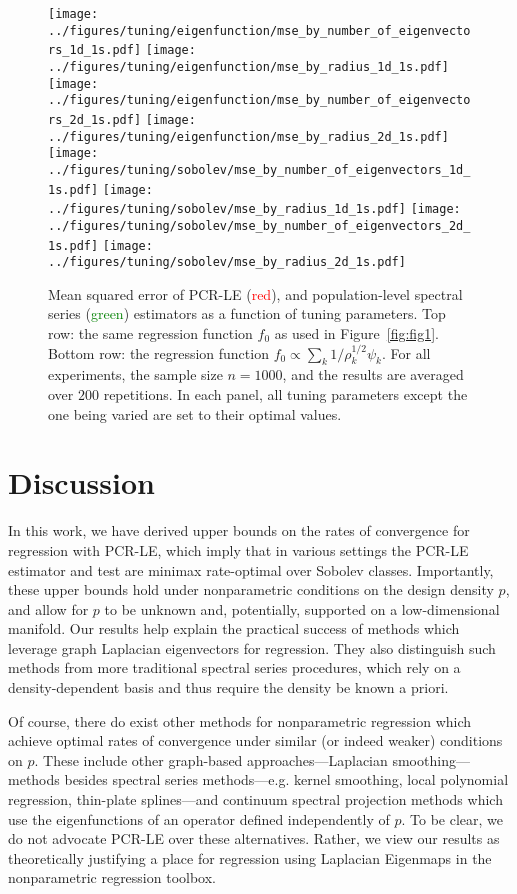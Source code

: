 \begin{figure*}[tb]
	\texttt{[image: ../figures/tuning/eigenfunction/mse\_by\_number\_of\_eigenvectors\_1d\_1s.pdf]}
	\texttt{[image: ../figures/tuning/eigenfunction/mse\_by\_radius\_1d\_1s.pdf]} 
	\texttt{[image: ../figures/tuning/eigenfunction/mse\_by\_number\_of\_eigenvectors\_2d\_1s.pdf]}
	\texttt{[image: ../figures/tuning/eigenfunction/mse\_by\_radius\_2d\_1s.pdf]} 
	\texttt{[image: ../figures/tuning/sobolev/mse\_by\_number\_of\_eigenvectors\_1d\_1s.pdf]}
	\texttt{[image: ../figures/tuning/sobolev/mse\_by\_radius\_1d\_1s.pdf]}
	\texttt{[image: ../figures/tuning/sobolev/mse\_by\_number\_of\_eigenvectors\_2d\_1s.pdf]}
	\texttt{[image: ../figures/tuning/sobolev/mse\_by\_radius\_2d\_1s.pdf]}  
	\caption{Mean squared error of PCR-LE (\textcolor{red}{red}), and population-level spectral series (\textcolor{green}{green}) estimators as a function of tuning parameters. Top row: the same regression function $f_0$ as used in Figure~\ref{fig:fig1}. Bottom row: the regression function $f_0 \propto \sum_{k} 1/\rho_k^{1/2} \psi_k$. For all experiments, the sample size $n = 1000$, and the results are averaged over $200$ repetitions. In each panel, all tuning parameters except the one being varied are set to their optimal values.}
	\label{fig:fig3}
\end{figure*}

\section{Discussion}
\label{sec:discussion}

In this work, we have derived upper bounds on the rates of convergence for regression with PCR-LE, which imply that in various settings the PCR-LE estimator and test are minimax rate-optimal over Sobolev classes. Importantly, these upper bounds hold under nonparametric conditions on the design density $p$, and allow for $p$ to be unknown and, potentially, supported on a low-dimensional manifold. Our results help explain the practical success of methods which leverage graph Laplacian eigenvectors for regression. They also distinguish such methods from more traditional spectral series procedures, which rely on a density-dependent basis and thus require the density be known a priori.

Of course, there do exist other methods for nonparametric regression which achieve optimal rates of convergence under similar (or indeed weaker) conditions on $p$. These include other graph-based approaches---Laplacian smoothing---methods besides spectral series methods---e.g. kernel smoothing, local polynomial regression, thin-plate splines---and continuum spectral projection methods which use the eigenfunctions of an operator defined independently of $p$. To be clear, we do not advocate PCR-LE over these alternatives. Rather, we view our results as theoretically justifying a place for regression using Laplacian Eigenmaps in the nonparametric regression toolbox. 

